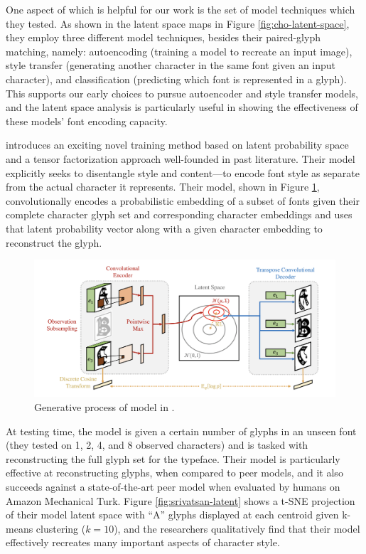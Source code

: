 One aspect of \cite{cho2022} which is helpful for our work is the set of model techniques which they tested. As shown in the latent space maps in Figure \ref{fig:cho-latent-space}, they employ three different model techniques, besides their paired-glyph matching, namely: autoencoding (training a model to recreate an input image), style transfer (generating another character in the same font given an input character), and classification (predicting which font is represented in a glyph). This supports our early choices to pursue autoencoder and style transfer models, and the latent space analysis is particularly useful in showing the effectiveness of these models' font encoding capacity.

\cite{srivatsan2020} introduces an exciting novel training method based on latent probability space and a tensor factorization approach well-founded in past literature. Their model explicitly seeks to disentangle style and content—to encode font style as separate from the actual character it represents. Their model, shown in Figure \ref{fig:srivatsan-model}, convolutionally encodes a probabilistic embedding of a subset of fonts given their complete character glyph set and corresponding character embeddings and uses that latent probability vector along with a given character embedding to reconstruct the glyph.

\begin{figure}[htbp]
    \centering
    \includegraphics[width=1\textwidth]{images/srivatsan-model.png}
    \caption{Generative process of model in \cite{srivatsan2020}.}
    \label{fig:srivatsan-model}
\end{figure}

At testing time, the model is given a certain number of glyphs in an unseen font (they tested on 1, 2, 4, and 8 observed characters) and is tasked with reconstructing the full glyph set for the typeface. Their model is particularly effective at reconstructing glyphs, when compared to peer models, and it also succeeds against a state-of-the-art peer model when evaluated by humans on Amazon Mechanical Turk. Figure \ref{fig:srivatsan-latent} shows a t-SNE projection of their model latent space with ``A'' glyphs displayed at each centroid given k-means clustering ($k=10$), and the researchers qualitatively find that their model effectively recreates many important aspects of character style.

